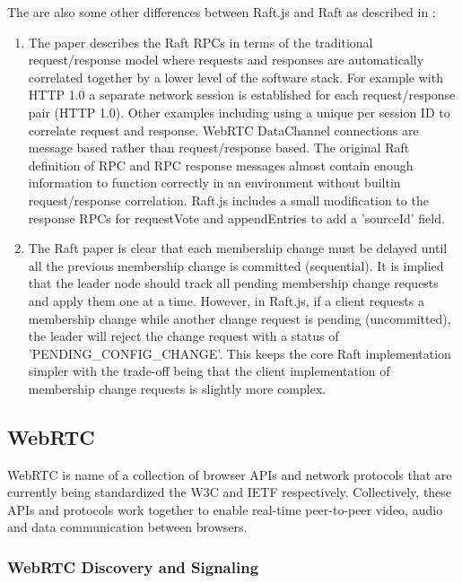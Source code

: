 \documentclass[9pt]{extarticle}
\begin{document}
\begin{multicols}{2}
The are also some other differences between Raft.js and Raft as
described in \cite[Consensus:~Diego]{raft_thesis:ongaro14}:

\begin{enumerate}
\item The paper describes the Raft RPCs in terms of the traditional
    request/response model where requests and responses are
    automatically correlated together by a lower level of the software
    stack. For example with HTTP 1.0 a separate network session is
    established for each request/response pair (HTTP 1.0). Other
    examples including using a unique per session ID to correlate
    request and response.  WebRTC DataChannel connections are message
    based rather than request/response based. The original Raft
    definition of RPC and RPC response messages almost contain enough
    information to function correctly in an environment without
    builtin request/response correlation. Raft.js includes a small
    modification to the response RPCs for requestVote and
    appendEntries to add a 'sourceId' field.
\item The Raft paper is clear that each membership change must be
    delayed until all the previous membership change is committed
    (sequential).  It is implied that the leader node should track all
    pending membership change requests and apply them one at a time.
    However, in Raft.js, if a client requests a membership change
    while another change request is pending (uncommitted), the leader
    will reject the change request with a status of
    'PENDING\_CONFIG\_CHANGE'. This keeps the core Raft implementation
    simpler with the trade-off being that the client implementation of
    membership change requests is slightly more complex.
\end{enumerate}

\subsection{WebRTC}

WebRTC is name of a collection of browser APIs and network protocols
that are currently being standardized the W3C and IETF respectively.
Collectively, these APIs and protocols work together to enable
real-time peer-to-peer video, audio and data communication between
browsers.

\subsubsection{WebRTC Discovery and Signaling}


\end{multicols}
\end{document}
